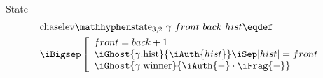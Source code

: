 
\begin{frame}{State}
\begin{align*}
		&\mathrm{chaselev \mathhyphen state_{3,2}}\ \gamma\ front\ back\ hist
		\eqdef
	\\
		&\iBigsep\left[\begin{array}{l}
				front = back + 1
			\\
				\iGhost{\gamma\mathrm{.hist}}{\iAuth{hist}} \iSep
				| hist | = front
			\\
				\iGhost{\gamma\mathrm{.winner}}{\iAuth{-} \cdot \iFrag{-}}
		\end{array}\right.
\end{align*}
\end{frame}